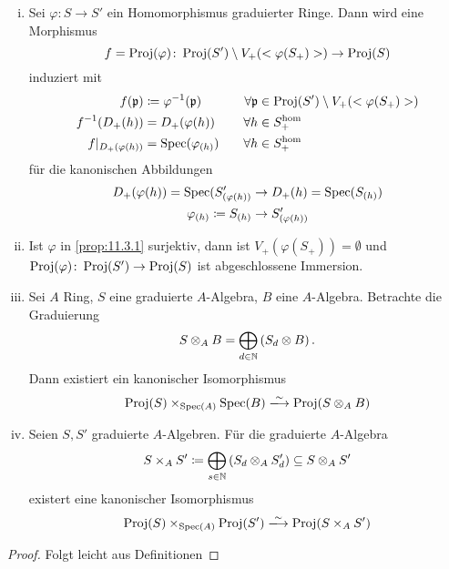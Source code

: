 \begin{prop}
  \label{prop:11.3}
  \begin{enumerate}[i)]
  \item\label{prop:11.3.1} Sei $\varphi \colon S \to S'$ ein Homomorphismus graduierter Ringe. Dann wird eine Morphismus
    \[
    f = \operatorname{Proj}(\varphi) \colon \operatorname{Proj}(S') \setminus V_+(<\varphi(S_+)>) \to \operatorname{Proj}(S)
    \]
    induziert mit
    \begin{alignat*}{2}
      f(\mathfrak{p}) &\coloneqq \varphi^{-1}(\mathfrak{p}) & \quad \forall \mathfrak{p} &\in \operatorname{Proj}(S') \setminus V_+(<\varphi(S_+)>) \\
      f^{-1} (D_+(h)) &= D_+(\varphi(h)) & \forall h &\in S_+^{\text{hom}} \\
      f|_{D_+(\varphi(h))} &= \operatorname{Spec}(\varphi_{(h)}) & \forall h &\in S_+^{\text{hom}}
    \end{alignat*}
    für die kanonischen Abbildungen
    \begin{align*}
      D_+(\varphi(h)) = \operatorname{Spec}(S_{(\varphi(h))}' & \to D_+(h) = \operatorname{Spec}(S_{(h)})\\
      \varphi_{(h)} \coloneqq S_{(h)} & \to S_{(\varphi(h))}'
    \end{align*}
  \item\label{prop:11.3.2} Ist $\varphi$ in \ref{prop:11.3.1} surjektiv, dann ist $V_+(\varphi(S_+)) = \emptyset$ und $\operatorname{Proj}(\varphi)\colon\operatorname{Proj}(S') \to \operatorname{Proj}(S)$ ist abgeschlossene Immersion.
  \item\label{prop:11.3.3} Sei $A$ Ring, $S$ eine graduierte $A$-Algebra, $B$ eine $A$-Algebra. Betrachte die Graduierung
    \[
    S \otimes_A B = \bigoplus_{d\in \mathbb {N}} \left( S_d \otimes B \right).
    \]
    Dann existiert ein kanonischer Isomorphismus
    \[
    \Proj(S) \times_{\Spec(A)} \Spec(B) \xlongrightarrow{\sim}\Proj(S \otimes_A B)
    \]
  \item\label{prop:11.3.4}
    Seien $S,S'$ graduierte $A$-Algebren. Für die graduierte $A$-Algebra
    \[
    S \times_A S' \coloneqq \bigoplus_{s\in\mathbb {N}} \left( S_d \otimes_A S_d' \right) \subseteq S \otimes_A S'
    \]
    existert eine kanonischer Isomorphismus
    \[
    \Proj(S) \times_{\Spec(A)} \Proj(S') \xlongrightarrow{\sim} \Proj(S \times_A S')
    \]
  \end{enumerate}
  
  \begin{proof}
    Folgt leicht aus Definitionen
  \end{proof}
\end{prop}

